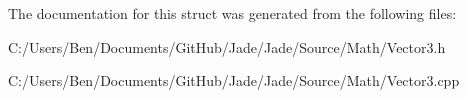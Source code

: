 The documentation for this struct was generated from the following files\+:\begin{DoxyCompactItemize}
\item 
C\+:/\+Users/\+Ben/\+Documents/\+Git\+Hub/\+Jade/\+Jade/\+Source/\+Math/Vector3.\+h\item 
C\+:/\+Users/\+Ben/\+Documents/\+Git\+Hub/\+Jade/\+Jade/\+Source/\+Math/Vector3.\+cpp\end{DoxyCompactItemize}
